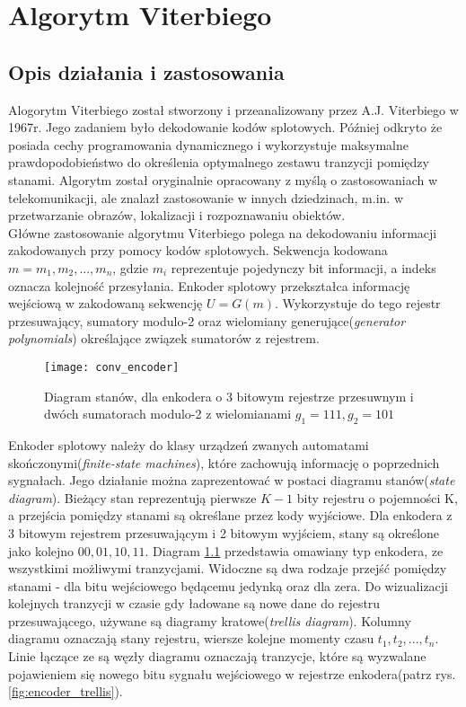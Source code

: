 \documentclass[document.tex]{subfiles}
\begin{document}
\chapter{Algorytm Viterbiego}
\section{Opis działania i zastosowania}
\indent Alogorytm Viterbiego został stworzony i przeanalizowany przez A.J. Viterbiego w 1967r. Jego zadaniem było dekodowanie kodów splotowych. Później odkryto że posiada cechy programowania dynamicznego i wykorzystuje maksymalne prawdopodobieństwo do określenia optymalnego zestawu tranzycji pomiędzy stanami. Algorytm został oryginalnie opracowany z myślą o zastosowaniach w telekomunikacji, ale znalazł zastosowanie w innych dziedzinach, m.in. w przetwarzanie obrazów, lokalizacji i rozpoznawaniu obiektów.\cite{viterbi_tutorial}
\\
\indent Główne zastosowanie algorytmu Viterbiego polega na
dekodowaniu informacji zakodowanych przy pomocy kodów splotowych. Sekwencja kodowana $m = m_1, m_2,...,m_n$, gdzie 
$m_i$ reprezentuje pojedynczy bit informacji, a indeks oznacza kolejność przesyłania. Enkoder splotowy przekształca informację wejściową w zakodowaną sekwencję $U = G(m)$.
Wykorzystuje do tego rejestr przesuwający, sumatory modulo-2 oraz wielomiany generujące(\textit{generator polynomials}) określające związek sumatorów z rejestrem.\cite{Comm_Sklar}\cite{viterbi_tutorial}

\begin{figure}[h]
\texttt{[image: conv\_encoder]}
\caption{Diagram stanów, dla enkodera o 3 bitowym rejestrze przesuwnym 
i dwóch sumatorach modulo-2 z wielomianami $g_1 = 111, g_2 = 101$ \protect\cite{Comm_Sklar}}
\label{fig:encoder}
\end{figure}

\clearpage
\indent Enkoder splotowy należy do klasy urządzeń zwanych automatami skończonymi(\textit{finite-state machines}), które zachowują informację o poprzednich sygnałach.
Jego działanie można zaprezentować w postaci diagramu stanów(\textit{state diagram}). Bieżący stan reprezentują pierwsze $K - 1$ bity rejestru o pojemności K, a przejścia pomiędzy stanami są określane przez kody wyjściowe.
Dla enkodera z 3 bitowym rejestrem przesuwającym i 2 bitowym wyjściem, stany są określone jako kolejno
$00, 01, 10, 11$. Diagram \ref{fig:encoder} przedstawia omawiany typ enkodera, ze wszystkimi możliwymi 
tranzycjami. Widoczne są dwa rodzaje przejść pomiędzy stanami - dla bitu wejściowego będącemu jedynką oraz dla zera. Do wizualizacji kolejnych tranzycji w czasie gdy ładowane są nowe dane do rejestru przesuwającego,
używane są diagramy kratowe(\textit{trellis diagram}).\cite{kody_splotowe}\cite{Comm_Sklar}\cite{viterbi_tutorial}
Kolumny diagramu oznaczają stany rejestru, wiersze kolejne momenty czasu $t_1, t_2, ..., t_n$. Linie łączące ze są węzły diagramu oznaczają tranzycje, które są wyzwalane pojawieniem się nowego bitu sygnału wejściowego w rejestrze enkodera(patrz rys. \ref{fig:encoder_trellis}).
\end{document}
